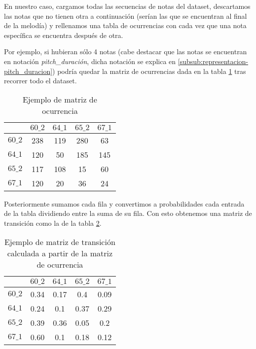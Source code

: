     En nuestro caso, cargamos todas las secuencias de notas del dataset, descartamos las notas que no tienen otra a continuación (serían las que se encuentran al final de la melodía) y rellenamos una tabla de ocurrencias con cada vez que una nota específica se encuentra después de otra.

    Por ejemplo, si hubieran sólo 4 notas (cabe destacar que las notas se encuentran en notación \textit{pitch\_duración}, dicha notación se explica en \ref{subsub:representacion-pitch_duracion}) podría quedar la matriz de ocurrencias dada en la tabla \ref{tab:sampleOcurrenceMatrix} tras recorrer todo el dataset.

    \begin{table}
	\centering
	\begin{tabular}{c|c|c|c|c}
		\textbf{} & \textbf{$60\_2$} & \textbf{$64\_1$} &         
            \textbf{$65\_2$} &     \textbf{$67\_1$}\\
		\hline
		\textbf{$60\_2$} & 238 & 119 & 280 & 63\\
		\hline
		\textbf{$64\_1$} & 120 & 50 & 185 & 145\\
		\hline
		\textbf{$65\_2$} & 117 & 108 & 15 & 60\\
		\hline
		\textbf{$67\_1$} & 120 & 20 & 36 & 24\\
	\end{tabular}
	\caption{Ejemplo de matriz de ocurrencia}
	\label{tab:sampleOcurrenceMatrix}
    \end{table}

    Posteriormente sumamos cada fila y convertimos a probabilidades cada entrada de la tabla dividiendo entre la suma de su fila. Con esto obtenemos una matriz de transición como la de la tabla \ref{tab:sampleTransitionMatrix}.

    \begin{table}
	\centering
	\begin{tabular}{c|c|c|c|c}
		\textbf{} & \textbf{$60\_2$} & \textbf{$64\_1$} &         
            \textbf{$65\_2$} &     \textbf{$67\_1$}\\
		\hline
		\textbf{$60\_2$} & 0.34 & 0.17 & 0.4 & 0.09\\
		\hline
		\textbf{$64\_1$} & 0.24 & 0.1 & 0.37 & 0.29\\
		\hline
		\textbf{$65\_2$} & 0.39 & 0.36 & 0.05 & 0.2\\
		\hline
		\textbf{$67\_1$} & 0.60 & 0.1 & 0.18 & 0.12\\
	\end{tabular}
	\caption{Ejemplo de matriz de transición calculada a partir de la matriz de ocurrencia}
	\label{tab:sampleTransitionMatrix}
    \end{table}

